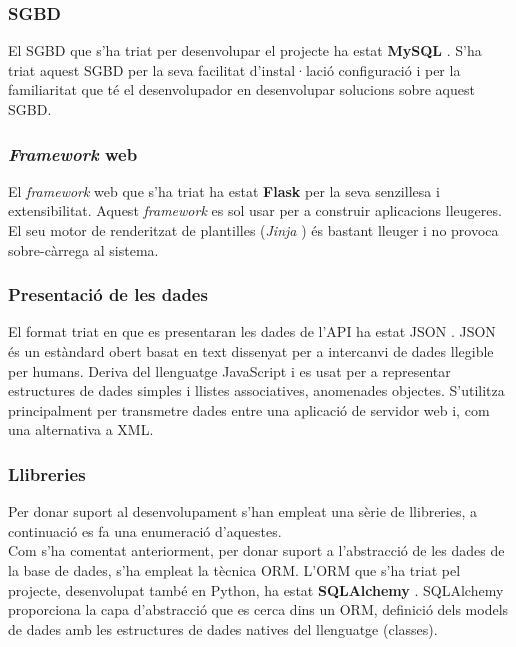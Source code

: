 	\subsubsection{\ac{SGBD}}
	El \ac{SGBD} que s'ha triat per desenvolupar el projecte ha estat \textbf{MySQL} \cite{mysql}. S'ha triat aquest \ac{SGBD} per la seva facilitat d'instal·lació configuració i per la familiaritat que té el desenvolupador en desenvolupar solucions sobre aquest \ac{SGBD}.

	\subsubsection{\emph{Framework} web}
	El \emph{framework} web que s'ha triat ha estat \textbf{Flask} \cite{flask} per la seva senzillesa i extensibilitat. Aquest \emph{framework} es sol usar per a construir aplicacions lleugeres. El seu motor de renderitzat de plantilles (\emph{Jinja} \cite{jinja}) és bastant lleuger i no provoca sobre-càrrega al sistema. 

	\subsubsection{Presentació de les dades}
	El format triat en que es presentaran les dades de l'\ac{API} ha estat \ac{JSON} \cite{json}. \ac{JSON} és un estàndard obert basat en text dissenyat per a intercanvi de dades llegible per humans. Deriva del llenguatge JavaScript i es usat per a representar estructures de dades simples i llistes associatives, anomenades objectes. S'utilitza principalment per transmetre dades entre una aplicació de servidor web i, com una alternativa a \ac{XML}.

	\subsubsection{Llibreries}
	Per donar suport al desenvolupament s'han empleat una sèrie de llibreries, a continuació es fa una enumeració d'aquestes.\\

	Com s'ha comentat anteriorment, per donar suport a l'abstracció de les dades de la base de dades, s'ha empleat la tècnica \ac{ORM}. L'\ac{ORM} que s'ha triat pel projecte, desenvolupat també en Python, ha estat \textbf{SQLAlchemy} \cite{sqlalchemy}. SQLAlchemy proporciona la capa d'abstracció que es cerca dins un \ac{ORM}, definició dels models de dades amb les estructures de dades natives del llenguatge (classes).\\

